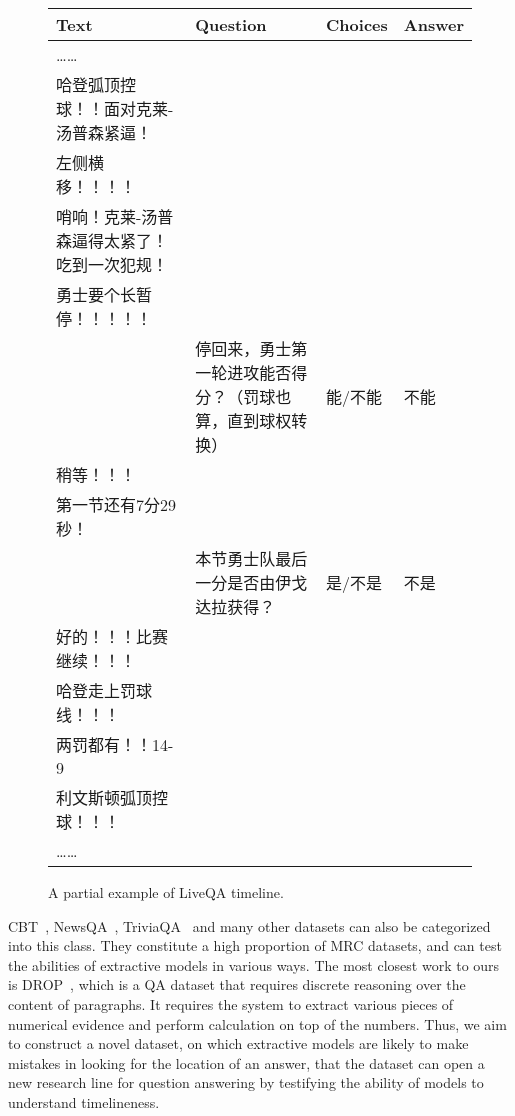 \begin{CJK}{UTF8}{gbsn}
\begin{figure}
        \centering
       \begin{tabular}{p{120pt}p{120pt}p{50pt}p{50pt}}
       \hline
       \textbf{Text} & \textbf{Question} & \textbf{Choices}& \textbf{Answer}\\
         \hline
         
          ……\\
          \small{哈登弧顶控球！！面对克莱-汤普森紧逼！}\\
          \small{左侧横移！！！！}\\
          \small{哨响！克莱-汤普森逼得太紧了！吃到一次犯规！}\\
         \small{勇士要个长暂停！！！！！}\\
         &\small{停回来，勇士第一轮进攻能否得分？（罚球也算，直到球权转换）}&\small{能/不能} & \small{不能}\\
         \small{稍等！！！}\\
         \small{第一节还有7分29秒！}\\
         &\small{本节勇士队最后一分是否由伊戈达拉获得？}&\small{是/不是} & \small{不是}\\
         \small{好的！！！比赛继续！！！}\\
         \small{哈登走上罚球线！！！}\\
         \small{两罚都有！！14-9}\\
         \small{利文斯顿弧顶控球！！！}\\
         ……\\

        \hline
        \hline
       \end{tabular}
       \caption{A partial example of LiveQA timeline.}
       \label{liveex}
\end{figure}
\end{CJK}

CBT~\cite{Hill2015The}, NewsQA~\cite{Trischler2016NewsQA}, TriviaQA~\cite{Joshi2017TriviaQA} and many other datasets can also be categorized into this class. They  constitute a high proportion of MRC datasets, and can test the abilities of extractive models in various ways. The most closest work to ours is DROP~\cite{dua2019drop}, which is a QA dataset that requires discrete reasoning over the content of paragraphs. It requires the system to extract various pieces of numerical evidence and perform calculation on top of the numbers. Thus, we aim to construct a novel dataset, on which extractive models are likely to make mistakes in looking for the location of an answer, that the dataset can open a new research line for question answering by testifying the ability of models to understand timelineness.

